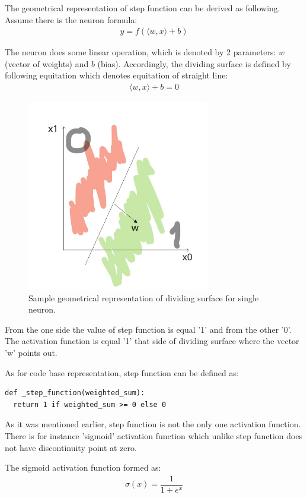 The geometrical representation of step function can be derived as following. Assume there is the neuron formula:
\begin{align*}
y = f(\langle w, x \rangle + b)
\end{align*}

The neuron does some linear operation, which is denoted by 2 parameters: $w$ (vector of weights) and $b$ (bias). Accordingly, the dividing surface is defined by following equitation which denotes equitation of straight line:
\begin{align*}
\langle w, x \rangle + b = 0
\end{align*}

\begin{figure}[h]
    \centering \includegraphics[width=8cm]{images/dividing_surface.jpg}
    \caption {Sample geometrical representation of dividing surface for single neuron.}
\end{figure}

From the one side the value of step function is equal '1' and from the other '0'. The activation function is equal '1' that side of dividing surface where the vector 'w' points out.

As for code base representation, step function can be defined as:
\begin{lstlisting}
def _step_function(weighted_sum):
  return 1 if weighted_sum >= 0 else 0
\end{lstlisting}
   
As it was mentioned earlier, step function is not the only one activation function. There is for instance 'sigmoid' activation function which unlike step function does not have discontinuity point at zero. 

The sigmoid activation function formed as:
\begin{align*}
\sigma(x) = \dfrac{1}{1+e^x}
\end{align*}


